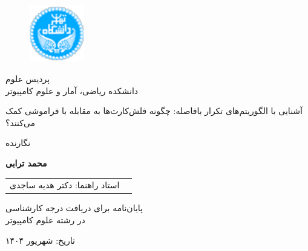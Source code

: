 \documentclass[12pt]{report}
\begin{document}

\begin{figure}
\centering
\includegraphics[height=2.5cm]{UT-Logo.pdf}
\end{figure}

\begin{center}
پردیس علوم
\\
دانشکده ریاضی، آمار و علوم کامپیوتر
\end{center}

\begin{center}
\end{center}

\begin{center}
\huge{آشنایی با الگوریتم‌های تکرار بافاصله: چگونه فلش‌کارت‌ها به مقابله با فراموشی کمک می‌کنند؟}
\end{center}

\begin{center}
\end{center}

\begin{center}
نگارنده
\end{center}
\begin{center}
\textbf{
محمد ترابی}
\end{center}

\begin{center}
\begin{tabular}{rr}
استاد راهنما: دکتر هدیه ساجدی

\end{tabular}
\end{center}

\vspace{3cm}
\begin{center}
پایان‌نامه برای دریافت درجه کارشناسی
\\
در رشته علوم کامپیوتر
\end{center}

\begin{center}
تاریخ: شهریور ۱۴۰۴
\end{center}

\pagestyle{empty}
\pagenumbering{}

\newpage
\pagestyle{plain}
\setcounter{page}{1}
\end{document}
